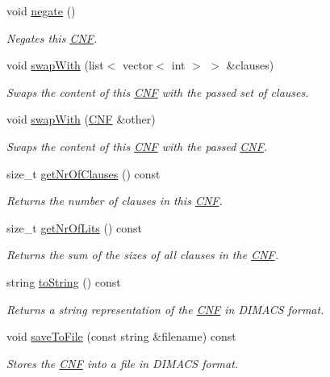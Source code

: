 \begin{DoxyCompactItemize}
void \hyperlink{classCNF_a1d4371fd3b970bde2e8542ab5ad0f881}{negate} ()
\begin{DoxyCompactList}\small\item\em Negates this \hyperlink{classCNF}{C\-N\-F}. \end{DoxyCompactList}\item 
void \hyperlink{classCNF_a39c340549f7acdc1393a5572f3e007cf}{swap\-With} (list$<$ vector$<$ int $>$ $>$ \&clauses)
\begin{DoxyCompactList}\small\item\em Swaps the content of this \hyperlink{classCNF}{C\-N\-F} with the passed set of clauses. \end{DoxyCompactList}\item 
void \hyperlink{classCNF_a52d1a7c0b807125871f9ac72655fb1d2}{swap\-With} (\hyperlink{classCNF}{C\-N\-F} \&other)
\begin{DoxyCompactList}\small\item\em Swaps the content of this \hyperlink{classCNF}{C\-N\-F} with the passed \hyperlink{classCNF}{C\-N\-F}. \end{DoxyCompactList}\item 
size\-\_\-t \hyperlink{classCNF_ad0bf994acbde601aa482f3d94ef1cb71}{get\-Nr\-Of\-Clauses} () const 
\begin{DoxyCompactList}\small\item\em Returns the number of clauses in this \hyperlink{classCNF}{C\-N\-F}. \end{DoxyCompactList}\item 
size\-\_\-t \hyperlink{classCNF_a4fafd0324a1c4c7f345b8df7f931aafa}{get\-Nr\-Of\-Lits} () const 
\begin{DoxyCompactList}\small\item\em Returns the sum of the sizes of all clauses in the \hyperlink{classCNF}{C\-N\-F}. \end{DoxyCompactList}\item 
string \hyperlink{classCNF_ae15ec06cc22d6cda868febd1708d331b}{to\-String} () const 
\begin{DoxyCompactList}\small\item\em Returns a string representation of the \hyperlink{classCNF}{C\-N\-F} in D\-I\-M\-A\-C\-S format. \end{DoxyCompactList}\item 
void \hyperlink{classCNF_aefe201cf4139e1ed2f4dfdcb2f8efdae}{save\-To\-File} (const string \&filename) const 
\begin{DoxyCompactList}\small\item\em Stores the \hyperlink{classCNF}{C\-N\-F} into a file in D\-I\-M\-A\-C\-S format. \end{DoxyCompactList}\item 

\end{DoxyCompactItemize}

